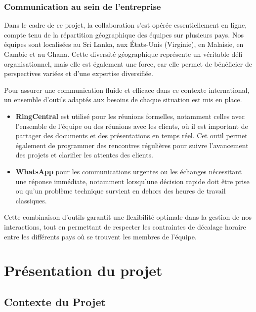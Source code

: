 \subsection*{Communication au sein de l'entreprise} \label{comm_au_sein_de_l_entreprise}

Dans le cadre de ce projet, la collaboration s'est opérée essentiellement en ligne, compte tenu de la répartition géographique des équipes sur plusieurs pays. Nos équipes sont localisées au Sri Lanka, aux États-Unis (Virginie), en Malaisie, en Gambie et au Ghana. Cette diversité géographique représente un véritable défi organisationnel, mais elle est également une force, car elle permet de bénéficier de perspectives variées et d'une expertise diversifiée.

\vspace{0.35cm}

Pour assurer une communication fluide et efficace dans ce contexte international, un ensemble d'outils adaptés aux besoins de chaque situation est mis en place. 

\begin{itemize}
    \item \textbf{RingCentral} est utilisé pour les réunions formelles, notamment celles avec l'ensemble de l'équipe ou des réunions avec les clients, où il est important de partager des documents et des présentations en temps réel. Cet outil permet également de programmer des rencontres régulières pour suivre l'avancement des projets et clarifier les attentes des clients.

    \item \textbf{WhatsApp} pour les communications urgentes ou les échanges nécessitant une réponse immédiate, notamment lorsqu'une décision rapide doit être prise ou qu'un problème technique survient en dehors des heures de travail classiques.
\end{itemize}

\vspace{0.35cm}

Cette combinaison d'outils garantit une flexibilité optimale dans la gestion de nos interactions, tout en permettant de respecter les contraintes de décalage horaire entre les différents pays où se trouvent les membres de l'équipe.

\chapter{Présentation du projet}

\section{Contexte du Projet} \label{context_du_projet}

